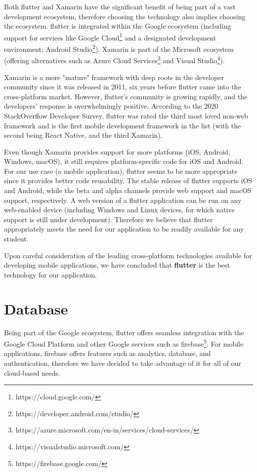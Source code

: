 Both \gls{flutter} and Xamarin have the significant benefit of being part of a vast development ecosystem, therefore choosing the technology also implies choosing the ecosystem. \gls{flutter} is integrated within the Google ecosystem (including support for services like Google Cloud\footnote{https://cloud.google.com/} and a designated development environment: Android Studio\footnote{https://developer.android.com/studio/}). Xamarin is part of the Microsoft ecosystem (offering alternatives such as Azure Cloud Services\footnote{https://azure.microsoft.com/en-in/services/cloud-services/} and Visual Studio\footnote{https://visualstudio.microsoft.com/}).

Xamarin is a more "mature" framework with deep roots in the developer community since it was released in 2011, six years before \gls{flutter} came into the cross-platform market. However, \gls{flutter}'s community is growing rapidly, and the developers' response is overwhelmingly positive. According to the 2020 StackOverflow Developer Survey\cite{stackoverflow2020survey}, \gls{flutter} was rated the third most loved non-web framework and is the first mobile development framework in the list (with the second being React Native, and the third Xamarin).

Even though Xamarin provides support for more platforms (iOS, Android, Windows, macOS), it still requires platform-specific code for iOS and Android. For our use case (a mobile application), \gls{flutter} seems to be more appropriate since it provides better code reusability. The stable release of \gls{flutter} supports iOS and Android, while the beta and alpha channels provide web support and macOS support, respectively. A web version of a \gls{flutter} application can be run on any web-enabled device (including Windows and Linux devices, for which native support is still under development). Therefore we believe that \gls{flutter} appropriately meets the need for our application to be readily available for any student.

Upon careful consideration of the leading cross-platform technologies available for developing mobile applications, we have concluded that \textbf{\gls{flutter}} is the best technology for our application.

\section{Database} \label{5:database}

Being part of the Google ecosystem, \gls{flutter} offers seamless integration with the Google Cloud Platform and other Google services such as \gls{firebase}\footnote{https://firebase.google.com/}. For mobile applications, \gls{firebase} offers features such as analytics, database, and authentication, therefore we have decided to take advantage of it for all of our cloud-based needs.

